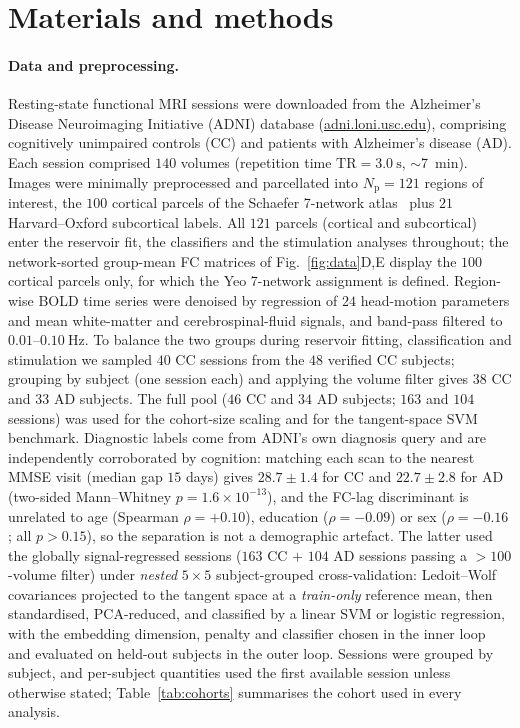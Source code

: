 \documentclass[11pt]{article}
\begin{document}
\section*{Materials and methods}


\paragraph{Data and preprocessing.}
Resting-state functional MRI sessions were downloaded from the Alzheimer's
Disease Neuroimaging Initiative (ADNI) database
(\href{https://adni.loni.usc.edu}{adni.loni.usc.edu}), comprising cognitively
unimpaired controls (CC) and patients with Alzheimer's disease (AD). Each session
comprised $140$ volumes (repetition time $\mathrm{TR}=\SI{3.0}{\second}$,
$\sim$\SI{7}{\minute}). Images were minimally preprocessed and parcellated into
$N_{\mathrm{p}}=121$ regions of interest, the $100$ cortical parcels of the
Schaefer 7-network atlas~\cite{schaefer2018} plus $21$ Harvard--Oxford
subcortical labels. All $121$ parcels (cortical and subcortical) enter the
reservoir fit, the classifiers and the stimulation analyses throughout; the
network-sorted group-mean FC matrices of Fig.~\ref{fig:data}D,E display the
$100$ cortical parcels only, for which the Yeo 7-network assignment is defined.
Region-wise BOLD time series were denoised by regression of $24$ head-motion
parameters and mean white-matter and cerebrospinal-fluid signals, and
band-pass filtered to $0.01$--$\SI{0.10}{\hertz}$. To balance the two groups
during reservoir fitting, classification and stimulation we sampled $40$ CC
sessions from the $48$ verified CC subjects; grouping by subject (one session
each) and applying the volume filter gives $38$ CC and $33$ AD subjects. The full
pool ($46$ CC and $34$ AD subjects; $163$ and $104$ sessions) was used for the
cohort-size scaling and for the tangent-space SVM benchmark.
Diagnostic labels come from ADNI's own diagnosis query and are independently
corroborated by cognition: matching each scan to the nearest MMSE visit (median
gap $15$ days) gives $28.7\pm1.4$ for CC and $22.7\pm2.8$ for AD (two-sided
Mann--Whitney $p=1.6\times10^{-13}$), and the FC-lag discriminant is unrelated to
age (Spearman $\rho=+0.10$), education ($\rho=-0.09$) or sex ($\rho=-0.16$; all
$p>0.15$), so the separation is not a demographic artefact. The latter used the
globally signal-regressed sessions ($163$ CC $+$ $104$ AD sessions passing a
$>$$100$-volume filter) under \emph{nested} $5\times5$ subject-grouped
cross-validation: Ledoit--Wolf covariances projected to the tangent space at a
\emph{train-only} reference mean, then standardised, PCA-reduced, and classified
by a linear SVM or logistic regression, with the embedding dimension, penalty and
classifier chosen in the inner loop and evaluated on held-out subjects in the
outer loop.
Sessions were grouped by subject, and per-subject quantities used the first
available session unless otherwise stated; Table~\ref{tab:cohorts} summarises the
cohort used in every analysis.
\end{document}
